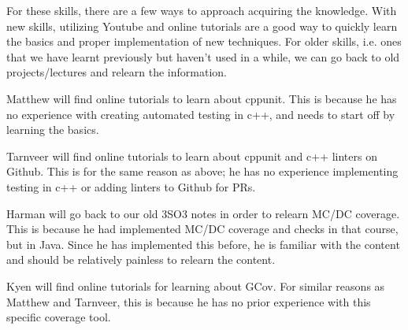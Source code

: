 \documentclass[12pt, titlepage]{article}
\begin{document}
\begin{enumerate}
For these skills, there are a few ways to approach acquiring the knowledge. With new skills, utilizing Youtube and online tutorials
are a good way to quickly learn the basics and proper implementation of new techniques. For older skills, i.e. ones that we have learnt
previously but haven't used in a while, we can go back to old projects/lectures and relearn the information.

Matthew will find online tutorials to learn about cppunit. This is because he has no experience with creating automated testing in c++, and needs 
to start off by learning the basics.

Tarnveer will find online tutorials to learn about cppunit and c++ linters on Github. This is for the same reason as above; he has no experience
implementing testing in c++ or adding linters to Github for PRs.

Harman will go back to our old 3SO3 notes in order to relearn MC/DC coverage. This is because he had implemented MC/DC coverage and checks 
in that course, but in Java. Since he has implemented this before, he is familiar with the content and should be relatively painless to 
relearn the content.

Kyen will find online tutorials for learning about GCov. For similar reasons as Matthew and Tarnveer, this is because he has no prior experience with 
this specific coverage tool.

\end{enumerate}
\end{document}

